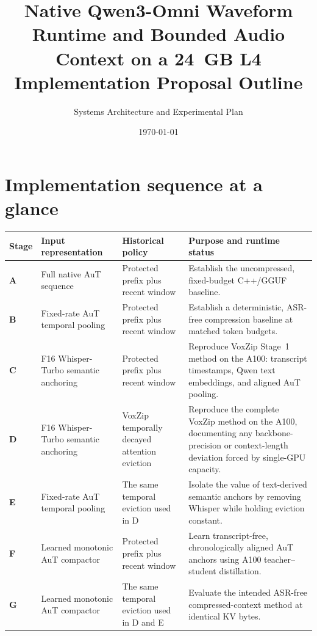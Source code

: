 \documentclass[10pt,letterpaper]{article}
\title{\textbf{Native Qwen3-Omni Waveform Runtime and Bounded Audio Context on a 24~GB L4}\\
\large Implementation Proposal Outline}
\author{Systems Architecture and Experimental Plan}
\date{\today}
\begin{document}
\maketitle

\section*{Implementation sequence at a glance}

\begin{table}[h]
\centering
\small
\setlength{\tabcolsep}{4pt}
\renewcommand{\arraystretch}{1.18}
\begin{tabularx}{\textwidth}{@{}>{\bfseries}p{0.42in}p{2.35in}p{1.75in}X@{}}
\toprule
Stage & Input representation & Historical policy & Purpose and runtime status \\
\midrule
A & Full native AuT sequence & Protected prefix plus recent window & Establish the uncompressed, fixed-budget C++/GGUF baseline. \\
B & Fixed-rate AuT temporal pooling & Protected prefix plus recent window & Establish a deterministic, ASR-free compression baseline at matched token budgets. \\
C & F16 Whisper-Turbo semantic anchoring & Protected prefix plus recent window & Reproduce VoxZip Stage~1 method on the A100: transcript timestamps, Qwen text embeddings, and aligned AuT pooling. \\
D & F16 Whisper-Turbo semantic anchoring & VoxZip temporally decayed attention eviction & Reproduce the complete VoxZip method on the A100, documenting any backbone-precision or context-length deviation forced by single-GPU capacity. \\
E & Fixed-rate AuT temporal pooling & The same temporal eviction used in D & Isolate the value of text-derived semantic anchors by removing Whisper while holding eviction constant. \\
F & Learned monotonic AuT compactor & Protected prefix plus recent window & Learn transcript-free, chronologically aligned AuT anchors using A100 teacher--student distillation. \\
G & Learned monotonic AuT compactor & The same temporal eviction used in D and E & Evaluate the intended ASR-free compressed-context method at identical KV bytes. \\
\bottomrule
\end{tabularx}
\end{table}
\end{document}
